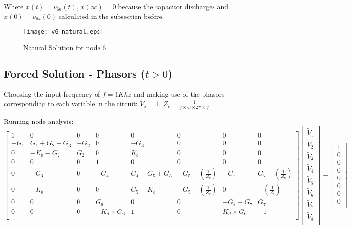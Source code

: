 Where $x(t)=v_{6n}(t)$, $x(\infty)=0$ because the capacitor discharges and $x(0)=v_{6n}(0)$ calculated in the subsection before.

\begin{figure}[h] \centering
\texttt{[image: v6\_natural.eps]}
\caption{Natural Solution for node 6}
\label{fig:forced}
\end{figure}

\subsection{Forced Solution - Phasors ($t>0$)}

Choosing the input frequency of $f=1Khz$ and making use of the phasors corresponding to each variable in the circuit: $\tilde{V}_{s}=1$, $\tilde{Z}_{c}=\frac{1}{j\times C \times 2\pi \times f}$

Running node analysis:
$$
\begin{bmatrix}
1  &  0 & 0 & 0 & 0 & 0 & 0 & 0       \\
-G_1 & G_1+G_2+G_3 & -G_2 & 0 & -G_3 & 0 & 0 & 0      \\
0 & -K_b-G_2 & G_2 & 0 & K_b & 0 & 0 & 0\\
0 & 0 & 0  & 1 & 0 & 0 & 0 & 0      \\
0 & -G_3 & 0 & -G_4 & G_4+G_5+G_3 & -G_5+(\frac{1}{Z_{c}}) & -G_7 & G_7-(\frac{1}{Z_{c}})\\
0 & -K_b & 0 & 0 & G_5+K_b & -G_5+(\frac{1}{Z_{c}}) & 0 & -(\frac{1}{Z_{c}}) \\
0 & 0& 0 & G_6 & 0 & 0 & -G_6-G_7 & G_7\\
0 & 0 & 0 & -K_d\times G_6 & 1 & 0 & K_d\times G_6 & -1\\
\end{bmatrix}
\begin{bmatrix}
\tilde{V}_{1}     \\
\tilde{V}_{2}    \\
\tilde{V}_{3}   \\
\tilde{V}_{4}     \\
\tilde{V}_{5}     \\
\tilde{V}_{6}     \\
\tilde{V}_{7}     \\
\tilde{V}_{8}     \\
\end{bmatrix}
=
\begin{bmatrix}
1   \\
0    \\
0  \\
0  \\
0  \\
0  \\
0  \\
0  \\
\end{bmatrix}
\quad
$$

